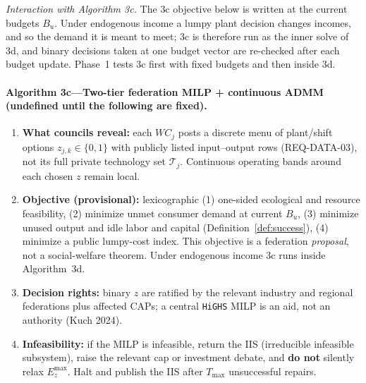 \documentclass[10pt,twoside,openany]{book}
\theoremstyle{dpepstyle}
\begin{document}
\emph{Interaction with Algorithm 3c.} The 3c objective below is written at the current budgets $B_u$. Under endogenous income a lumpy plant decision changes incomes, and so the demand it is meant to meet; 3c is therefore run as the inner solve of 3d, and binary decisions taken at one budget vector are re-checked after each budget update. Phase~1 tests 3c first with fixed budgets and then inside 3d.

\paragraph{Algorithm 3c---Two-tier federation MILP + continuous ADMM (undefined until the following are fixed).}
\begin{enumerate}[leftmargin=1.6em,itemsep=1pt]
  \item \textbf{What councils reveal:} each $WC_j$ posts a discrete menu of plant/shift options $z_{j,k}\in\{0,1\}$ with publicly listed input--output rows (REQ-DATA-03), not its full private technology set $\mathcal{T}_j$. Continuous operating bands around each chosen $z$ remain local.
  \item \textbf{Objective (provisional):} lexicographic (1) one-sided ecological and resource feasibility, (2) minimize unmet consumer demand at current $B_u$, (3) minimize unused output and idle labor and capital (Definition~\ref{def:success}), (4) minimize a public lumpy-cost index. This objective is a federation \emph{proposal}, not a social-welfare theorem. Under endogenous income 3c runs inside Algorithm~3d.
  \item \textbf{Decision rights:} binary $z$ are ratified by the relevant industry and regional federations plus affected CAPs; a central \texttt{HiGHS} MILP is an aid, not an authority (Kuch 2024).
  \item \textbf{Infeasibility:} if the MILP is infeasible, return the IIS (irreducible infeasible subsystem), raise the relevant cap or investment debate, and \textbf{do not} silently relax $E_z^{\max}$. Halt and publish the IIS after $T_{\max}$ unsuccessful repairs.
\end{enumerate}
\end{document}
